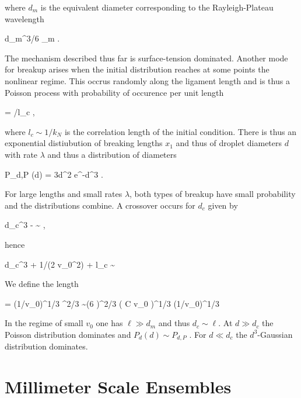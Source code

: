 where $d_m$ is the equivalent diameter corresponding to the Rayleigh-Plateau wavelength

\be
  \pi  d_m^3/6 \simeq  \lambda_m \pi . 
\nd


The mechanism described thus far is surface-tension dominated. 
Another mode for breakup arises when the initial distribution reaches 
at some points the nonlinear regime. This occrus randomly along
the ligament length and is thus a Poisson process with probability of 
occurence per unit length

\be
\lambda = \exp[{-1/(2 v_0^2)}]/l_c \label{p3} , 
\nd

where $l_c \sim 1/k_N$ is the correlation length of the initial condition. There is thus an exponential distiubution
of breaking lengths $x_1$ and thus of droplet diameters $d$ with rate $\lambda$ and thus a distribution of diameters

\be
  P_{d,P} (d) = {3d^2} \lambda e^{-\lambda d^3} \label{PP} .
\nd

For large lengths and small rates $\lambda$, both types of breakup have small probability and the distributions
  combine. A crossover occurs for $d_c$ given by

\be
  {\lambda d_c^3} - \ln \lambda  \sim {} , 
\nd

hence

\be
  {\lambda d_c^3} + 1/(2 v_0^2) + \ln l_c \sim {}
\nd 

We define the length

\be
  \ell = (1/v_0)^{1/3} \sigma^{2/3} \sim   (6  \pi)^{2/3} \left(  {C \ln v_0} \right)^{1/3}  (1/v_0)^{1/3}
\nd

In the regime of small $v_0$ one has $\ell \gg d_m$ and thus $d_c \sim \ell$. At $d \gg d_c$ the Poisson distribution
dominates and $P_d(d) \sim P_{d,P}$ . 
For $d \ll d_c$ the $d^3$-Gaussian distribution dominates. 


\section{Millimeter Scale Ensembles}

